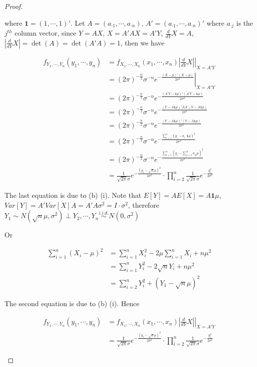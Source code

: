 \documentclass[a4paper, 11pt]{article}
\begin{document}
\begin{proof}
\begin{enumerate}[label=(\alph*)]
\begin{enumerate}[label=(\roman*)]
	where $\mathbf{1}=(1,\cdots,1)'$. Let $A=(a_{\cdot1},\cdots,a_{\cdot n})$, $A'=(a_{\cdot 1},\cdots,a_{\cdot n})'$ where $a_{\cdot j}$ is the $j^{th}$ column vector,  
	since $Y=AX$, $X=A'AX=A'Y$, $\frac{d}{dY}X= A$, $\left|\frac{d}{dY}X\right|=\det(A)=\det(A'A)=1$,	then  we have 
	
	\begin{align*}
	f_{Y_1,\cdots,Y_n}\left(y_1,\cdots,y_n\right)& =\left. f_{X_1,\cdots,X_n}(x_1,\cdots,x_n)\left|\frac{d}{dY}X\right|\right|_{X=A'Y}\\
	&  =\left. \left(2\pi\right)^{-\frac{n}{2}}\sigma^{-n}e^{-\frac{(X-\mu)'(X-\mu)}{2\sigma^2}}\right|_{X=A'Y}\\
	& = \left(2\pi\right)^{-\frac{n}{2}}\sigma^{-n}e^{-\frac{(A'Y-\mathbf{1}\mu)'(A'Y-\mathbf{1}\mu)}{2\sigma^2}}\\
	& = \left(2\pi\right)^{-\frac{n}{2}}\sigma^{-n}e^{-\frac{(Y-A\mathbf{1}\mu)'AA'(Y-A\mathbf{1}\mu)}{2\sigma^2}}\\
	& = \left(2\pi\right)^{-\frac{n}{2}}\sigma^{-n}e^{-\frac{(Y-A\mathbf{1}\mu)'(Y-A\mathbf{1}\mu)}{2\sigma^2}}\\
	& = \left(2\pi\right)^{-\frac{n}{2}}\sigma^{-n}e^{-\frac{\sum_{i=1}^n(y_i-a_{i\cdot }\mathbf{1}\mu)^2}{2\sigma^2}}\\
	& = \left(2\pi\right)^{-\frac{n}{2}}\sigma^{-n}e^{-\frac{\sum_{i=1}^n\left(y_i-\sum_{j=1}^na_{ij}\mu\right)^2}{2\sigma^2}}\\
	& = \frac{1}{\sqrt{2\pi}\sigma} e^{-\frac{(y_1-\sqrt{n}\mu)^2}{2\sigma^2}}\cdot\prod_{i=2}^n  \frac{1}{\sqrt{2\pi}\sigma} e^{-\frac{y_i^2}{2\sigma^2}}
	\end{align*}
	 
The last equation is due to (b) (i).	Note that $E[Y]= AE[X]=A\mathbf{1}\mu$,$Var[Y]=A'Var[X]A=A'A\sigma^2=I\cdot\sigma^2$, therefore $Y_1\sim N(\sqrt{n}\mu,\sigma^2 )\perp Y_2,\cdots,Y_n\stackrel{i.i.d.}{\sim}N(0,\sigma^2)$


Or 

\begin{align*}
\sum_{i=1}^n \left(X_i-\mu\right)^2 & = \sum_{i=1}^nX_i^2-2\mu\sum_{i=1}^nX_i+n\mu^2\\
& = \sum_{i=1}^n Y_i^2-2\sqrt{n} Y_i+n\mu^2\\
& = \sum_{i=2}^nY_i^2+(Y_1-\sqrt{n}\mu)^2 
\end{align*}

The second equation is due to (b) (i). Hence 

\begin{align*}
	f_{Y_1,\cdots,Y_n}\left(y_1,\cdots,y_n\right)& =\left. f_{X_1,\cdots,X_n}(x_1,\cdots,x_n)\left|\frac{d}{dY}X\right|\right|_{X=A'Y}\\
	& = \frac{1}{\sqrt{2\pi}\sigma} e^{-\frac{(y_1-\sqrt{n}\mu)^2}{2\sigma^2}}\cdot\prod_{i=2}^n  \frac{1}{\sqrt{2\pi}\sigma} e^{-\frac{y_i^2}{2\sigma^2}} 
\end{align*}
	

\end{enumerate}
\end{enumerate}
\end{proof}
\end{document}
